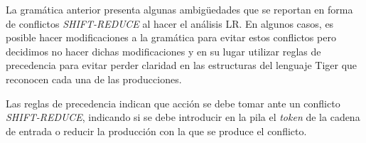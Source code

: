 \documentclass{article}
\begin{document}
La gramática anterior presenta algunas ambigüedades que se reportan en forma de
conflictos \emph{SHIFT-REDUCE} al hacer el análisis LR. En algunos casos,
es posible hacer modificaciones a la gramática para evitar estos conflictos
pero decidimos no hacer dichas modificaciones y en su lugar utilizar reglas
de precedencia para evitar perder claridad en las estructuras del lenguaje
Tiger que reconocen cada una de las producciones.

Las reglas de precedencia indican que acción se debe tomar ante un conflicto
\emph{SHIFT-REDUCE}, indicando si se debe introducir en la pila el
\emph{token} de la cadena de entrada o reducir la producción con la que
se produce el conflicto.
\end{document}
